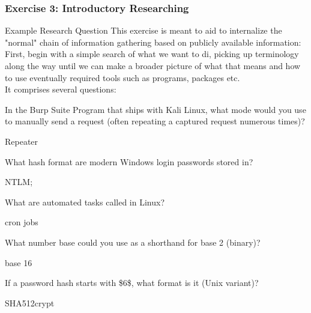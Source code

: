 \subsubsection*{Exercise 3: Introductory Researching}
\begin{task}{Example Research Question}
This exercise is meant to aid to internalize the "normal" chain of information gathering based on publicly available information:\\
First, begin with a simple search of what we want to di, picking up terminology along the way until we can make a broader picture of what that means and how to use eventually required tools such as programs, packages etc.\\
It comprises several questions:\\

\begin{question}
In the Burp Suite Program that ships with Kali Linux, what mode would you use to manually send a request (often repeating a captured request numerous times)?
\end{question}
\begin{answer}
Repeater
\end{answer}

\begin{question}
What hash format are modern Windows login passwords stored in?
\end{question}
\begin{answer}
NTLM;
\end{answer}

\begin{question}
What are automated tasks called in Linux?
\end{question}
\begin{answer}
cron jobs
\end{answer}

\begin{question}
What number base could you use as a shorthand for base 2 (binary)?
\end{question}
\begin{answer}
base 16
\end{answer}

\begin{question}
If a password hash starts with \$6\$, what format is it (Unix variant)?
\end{question}
\begin{answer}
SHA512crypt
\end{answer}
\end{task}

